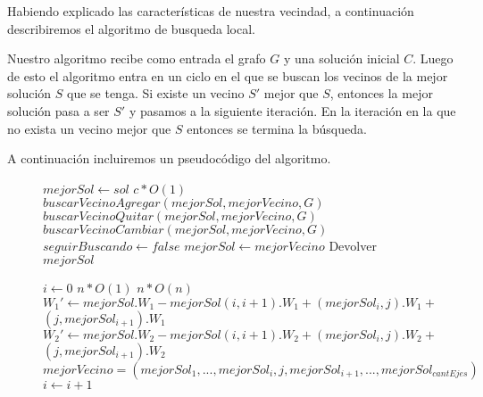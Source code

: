 Habiendo explicado las características de nuestra vecindad, a continuación describiremos el algoritmo de busqueda local.

Nuestro algoritmo recibe como entrada el grafo $G$ y una solución inicial $C$. Luego de esto el algoritmo entra en un ciclo en el que se buscan los vecinos de la mejor solución $S$ que se tenga. Si existe un vecino $S'$ mejor que $S$, entonces la mejor solución pasa a ser $S'$ y pasamos a la siguiente iteración. En la iteración en la que no exista un vecino mejor que $S$ entonces se termina la búsqueda.

A continuación incluiremos un pseudocódigo del algoritmo.
\begin{center}
 \begin{figure}[H]
  \begin{pseudo}
   \State $mejorSol \leftarrow sol$
   \hfill$c*O(1)$
      \State $buscarVecinoAgregar(mejorSol, mejorVecino, G)$
      \State $buscarVecinoQuitar(mejorSol, mejorVecino, G)$
      \State $buscarVecinoCambiar(mejorSol, mejorVecino, G)$
	\State $seguirBuscando \leftarrow false$
      \Else
	\State $mejorSol \leftarrow mejorVecino$
      \EndIf
   \EndWhile
   \State Devolver $mejorSol$
   \EndProcedure
  \end{pseudo}
  \label{Figura 1: busquedaLocal}
 \end{figure}
\end{center}

\begin{flushleft}
 \begin{figure}[H]
  \begin{pseudo}
   \State $i \leftarrow 0$
   \hfill$n*O(1)$
      \hfill$n*O(n)$
	  \State $W_1' \leftarrow mejorSol.W_1 - mejorSol(i,i+1).W_1 + (mejorSol_i,j).W_1 + $
	  \State $(j,mejorSol_{i+1}).W_1$
	  \State $W_2' \leftarrow mejorSol.W_2 - mejorSol(i,i+1).W_2 + (mejorSol_i,j).W_2 + $
	  \State $(j,mejorSol_{i+1}).W_2$
	    \State $mejorVecino = (mejorSol_1, ... ,mejorSol_i, j, mejorSol_{i+1}, ..., mejorSol_{cantEjes})$
	  \EndIf
      \EndFor
      \State $i \leftarrow i+1$
   \EndWhile
   \EndProcedure
  \end{pseudo}
 \end{figure}
\end{flushleft}

